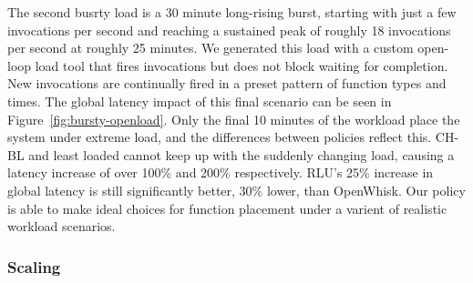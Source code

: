 

The second busrty load is a 30 minute long-rising burst, starting with just a few invocations per second and reaching a sustained peak of roughly 18 invocations per second at roughly 25 minutes.
We generated this load with a custom open-loop load tool that fires invocations but does not block waiting for completion.
New invocations are continually fired in a preset pattern of function types and times.
The global latency impact of this final scenario can be seen in Figure~\ref{fig:bursty-openload}.
Only the final 10 minutes of the workload place the system under extreme load, and the differences between policies reflect this.
CH-BL and least loaded cannot keep up with the suddenly changing load, causing a latency increase of over 100\% and 200\% respectively.
RLU's 25\% increase in global latency is still significantly better, 30\% lower, than OpenWhisk.
Our policy is able to make ideal choices for function placement under a varient of realistic workload scenarios.

  \vspace*{-0.2cm}
\subsubsection{Scaling}

